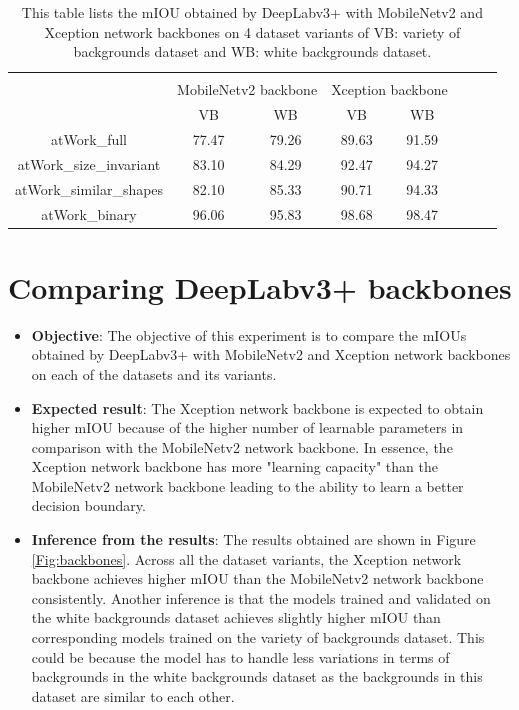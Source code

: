 	\begin{table}
	\centering
	\begin{tabular}{|c|c|c|c|c|c|c|c|}
	\hline 
	\multicolumn{ 1}{|l|}{\makecell{\textbf{Dataset variant}}} & \multicolumn{ 4}{l|}{\makecell{\textbf{mIOU in \%}}} \\ \cline{ 2- 5}
	\multicolumn{ 1}{|l|}{} & \multicolumn{ 2}{l|}{MobileNetv2 backbone} & \multicolumn{ 2}{l|}{Xception backbone} \\ \cline{ 2- 5}
	\multicolumn{ 1}{|l|}{} & VB & WB & VB & WB \\ \hline 
	atWork\_full & 77.47 & 79.26 & 89.63 & 91.59 \\ 
	\hline 
	atWork\_size\_invariant & 83.10 & 84.29 & 92.47 & 94.27 \\ 
	\hline 
	atWork\_similar\_shapes & 82.10 & 85.33 & 90.71 & 94.33 \\ 
	\hline 
	atWork\_binary & 96.06 & 95.83 & 98.68 & 98.47 \\ 
	\hline 
	\end{tabular}
	\caption{This table lists the mIOU obtained by DeepLabv3+ with MobileNetv2 and Xception network backbones on 4 dataset variants of VB: variety of backgrounds dataset and WB: white backgrounds dataset.} 
	\label{Table:vars}
\end{table}

\section{Comparing DeepLabv3+ backbones}

	\begin{itemize}
		\item \textbf{Objective}: The objective of this experiment is to compare the mIOUs obtained by DeepLabv3+ with MobileNetv2 and Xception network backbones on each of the datasets and its variants.
		\item \textbf{Expected result}: The Xception network backbone is expected to obtain higher mIOU because of the higher number of learnable parameters in comparison with the MobileNetv2 network backbone. In essence, the Xception network backbone has more "learning capacity" than the MobileNetv2 network backbone leading to the ability to learn a better decision boundary.
		\item \textbf{Inference from the results}: The results obtained are shown in Figure \ref{Fig:backbones}. Across all the dataset variants, the Xception network backbone achieves higher mIOU than the MobileNetv2 network backbone consistently. Another inference is that the models trained and validated on the white backgrounds dataset achieves slightly higher mIOU than corresponding models trained on the variety of backgrounds dataset. This could be because the model has to handle less variations in terms of backgrounds in the white backgrounds dataset as the backgrounds in this dataset are similar to each other.
	\end{itemize}

